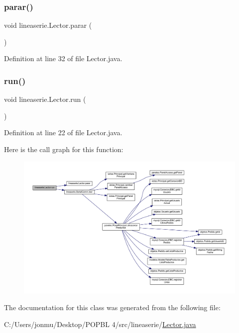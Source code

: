 \subsubsection{\texorpdfstring{parar()}{parar()}}
{\footnotesize\ttfamily void lineaserie.\+Lector.\+parar (\begin{DoxyParamCaption}{ }\end{DoxyParamCaption})}



Definition at line 32 of file Lector.\+java.

\mbox{\label{classlineaserie_1_1_lector_ac57211de70ab9a4bd7aa80ab491f7fca}} 
\subsubsection{\texorpdfstring{run()}{run()}}
{\footnotesize\ttfamily void lineaserie.\+Lector.\+run (\begin{DoxyParamCaption}{ }\end{DoxyParamCaption})}



Definition at line 22 of file Lector.\+java.

Here is the call graph for this function\+:\nopagebreak
\begin{figure}[H]
\begin{center}
\leavevmode
\includegraphics[width=350pt]{classlineaserie_1_1_lector_ac57211de70ab9a4bd7aa80ab491f7fca_cgraph}
\end{center}
\end{figure}


The documentation for this class was generated from the following file\+:\begin{DoxyCompactItemize}
\item 
C\+:/\+Users/jonmu/\+Desktop/\+P\+O\+P\+B\+L 4/src/lineaserie/\mbox{\hyperlink{_lector_8java}{Lector.\+java}}\end{DoxyCompactItemize}
